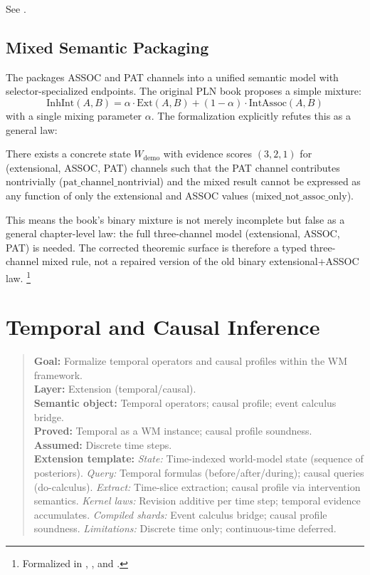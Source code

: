 \documentclass[11pt,openany]{report}
\begin{document}
See .

\section{Mixed Semantic Packaging}

The  packages ASSOC and PAT channels into a
unified semantic model with selector-specialized endpoints.  The original
PLN book proposes a simple mixture:
\[
  \mathrm{InhInt}(A, B) = \alpha \cdot \mathrm{Ext}(A, B)
  + (1 - \alpha) \cdot \mathrm{IntAssoc}(A, B)
\]
with a single mixing parameter $\alpha$.  The formalization explicitly
refutes this as a general law:

\begin{theorem}
\label{thm:no-mixed-policy}
There exists a concrete state $W_{\mathrm{demo}}$ with evidence scores
$(3, 2, 1)$ for (extensional, ASSOC, PAT) channels such that the PAT
channel contributes nontrivially ($\mathrm{pat\_channel\_nontrivial}$) and
the mixed result cannot be expressed as any function of only the
extensional and ASSOC values ($\mathrm{mixed\_not\_assoc\_only}$).
\end{theorem}

This means the book's binary mixture is not merely incomplete but false
as a general chapter-level law: the full three-channel model
(extensional, ASSOC, PAT) is needed.
The corrected theoremic surface is therefore a typed three-channel mixed
rule, not a repaired version of the old binary extensional+ASSOC law.%
\footnote{Formalized in ,
  , and
  .}


\chapter{Temporal and Causal Inference}
\label{ch:temporal}

\begin{quote}\small
\textbf{Goal:} Formalize temporal operators and causal profiles within the WM framework.\\
\textbf{Layer:} Extension (temporal/causal).\\
\textbf{Semantic object:} Temporal operators; causal profile; event calculus bridge.\\
\textbf{Proved:} Temporal as a WM instance; causal profile soundness.\\
\textbf{Assumed:} Discrete time steps.\\[4pt]
\textbf{Extension template:}
\textit{State:} Time-indexed world-model state (sequence of posteriors).
\textit{Query:} Temporal formulas (before/after/during); causal queries (do-calculus).
\textit{Extract:} Time-slice extraction; causal profile via intervention semantics.
\textit{Kernel laws:} Revision additive per time step; temporal evidence accumulates.
\textit{Compiled shards:} Event calculus bridge; causal profile soundness.
\textit{Limitations:} Discrete time only; continuous-time deferred.
\end{quote}
\end{document}

